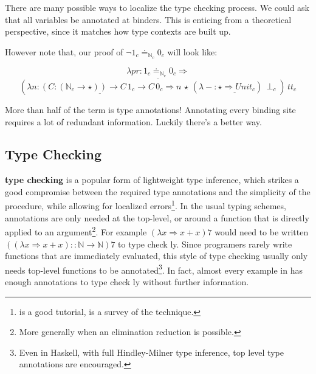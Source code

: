 \section{\Bidir{} \SLang{}}
 
There are many possible ways to localize the type checking process.
We could ask that all variables be annotated at binders.
This is enticing from a theoretical perspective, since it matches how type contexts are built up.
 
However note that, our proof of $\lnot1_{c}\doteq_{\mathbb{N}_{c}}0_{c}$ will look like:

\[
\lambda pr\underline{:1_{c}\doteq_{\mathbb{N}_{c}}0_{c}}\Rightarrow
\]
\[
\left(\lambda n \underline{:\left(C:\left(\mathbb{N}_{c}\rightarrow\star\right)\right)\rightarrow C\,1_{c}\rightarrow C\,0_{c}}\Rightarrow n\,\star\,(\lambda - \underline{:\star\Rightarrow Unit_{c}})\,\perp_{c}\right)\,tt_{c}
\]

More than half of the term is type annotations!
Annotating every binding site requires a lot of redundant information.
Luckily there's a better way.
 
\subsection{\Bidir{} Type Checking}
 
\textbf{\Bidir{} type checking} is a popular form of lightweight type inference, which strikes a good compromise between the required type annotations and the simplicity of the procedure, while allowing for localized errors\footnote{
  \cite{christiansen2013bidirectional} is a good tutorial, \cite{10.1145/3450952} is a survey of the technique.
}.
In the usual \bidir{} typing schemes, annotations are only needed at the top-level, or around a function that is directly applied to an argument\footnote{
  More generally when an elimination reduction is possible.
}.
For example $(\lambda x\Rightarrow x+x)7$ would need to be written $\left((\lambda x\Rightarrow x+x)::\mathbb{N}\rightarrow\mathbb{N}\right)7$ to type check \bidir{}ly.
Since programers rarely write functions that are immediately evaluated, this style of type checking usually only needs top-level functions to be annotated\footnote{
  Even in Haskell, with full Hindley-Milner type inference, top level type annotations are encouraged.
}.
In fact, almost every example in  has enough annotations to type check \bidir{}ly without further information.
 

